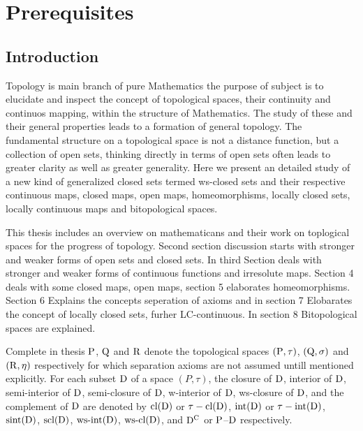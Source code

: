 \chapter{Prerequisites}
\graphicspath{{Chapter1/Chapter1Figs/EPS/}{Chapter1/Chapter1Figs/}}

\section{Introduction}\label{sec1.1}

Topology is main branch of pure Mathematics the purpose of subject is to elucidate and inspect the concept of topological spaces, their continuity and continuos mapping, within the structure of Mathematics. The study of these and their general properties leads to a formation of general topology. The fundamental structure on a topological space is not a distance function, but a collection of open sets, thinking directly in terms of open sets often leads to greater clarity as well as greater generality. Here we present an detailed study of a new kind of generalized closed sets termed ws-closed sets and their respective continuous maps, closed maps, open maps, homeomorphisms, locally closed sets, locally continuous maps and bitopological spaces.

This thesis includes an overview on mathematicans and their work on toplogical spaces for the progress of topology. Second section discussion starts with stronger and weaker forms of open sets and closed sets. In third Section deals with stronger and weaker forms of continuous functions and irresolute maps. Section 4 deals with some closed maps, open maps, section 5 elaborates homeomorphisms. Section 6 Explains the concepts seperation of axioms and in section 7 Elobarates the concept of locally closed sets, furher LC-continuous. In section 8 Bitopological spaces are explained.

Complete in thesis $\mathrm{P}$, $\mathrm{Q}$ and $\mathrm{R}$ denote the topological spaces $(\mathrm{P},\tau)$, $(\mathrm{Q},\sigma)$ and $(\mathrm{R}, \eta)$ respectively for which separation axioms are not assumed untill mentioned explicitly. For each subset $\mathrm{D}$ of a space $(P, \tau)$, the closure of $\mathrm{D}$, interior of $\mathrm{D}$, semi-interior of $\mathrm{D}$, semi-closure of $\mathrm{D}$, w-interior of $\mathrm{D}$, ws-closure of $\mathrm{D}$, and the complement of $\mathrm{D}$ are denoted by $\mbox{cl}(\mathrm{D})$ or $\tau-\mbox{cl}(\mathrm{D})$, $\mbox{int}(\mathrm{D})$ or $\tau-\mbox{int}(\mathrm{D})$, $\mbox{sint}(\mathrm{D})$, $\mbox{scl}(\mathrm{D})$, $\mbox{ws-int}(\mathrm{D})$, $\mbox{ws-cl}(\mathrm{D})$, and $\mathrm{D}^{\text{C}}$ or $\mathrm{P}$--$\mathrm{D}$ respectively.

